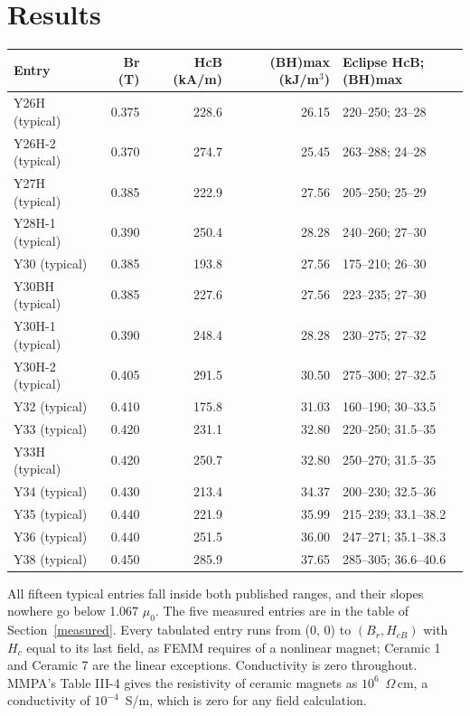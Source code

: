 \documentclass[
  11pt,
]{article}
\begin{document}
\section{Results}\label{results}

\begin{center}
\begin{tabular}{lrrrl}
\toprule
Entry & Br (T) & HcB (kA/m) & (BH)max (kJ/m\(^3\)) & Eclipse HcB; (BH)max \\
\midrule
Y26H (typical) & 0.375 & 228.6 & 26.15 & 220--250; 23--28 \\
Y26H-2 (typical) & 0.370 & 274.7 & 25.45 & 263--288; 24--28 \\
Y27H (typical) & 0.385 & 222.9 & 27.56 & 205--250; 25--29 \\
Y28H-1 (typical) & 0.390 & 250.4 & 28.28 & 240--260; 27--30 \\
Y30 (typical) & 0.385 & 193.8 & 27.56 & 175--210; 26--30 \\
Y30BH (typical) & 0.385 & 227.6 & 27.56 & 223--235; 27--30 \\
Y30H-1 (typical) & 0.390 & 248.4 & 28.28 & 230--275; 27--32 \\
Y30H-2 (typical) & 0.405 & 291.5 & 30.50 & 275--300; 27--32.5 \\
Y32 (typical) & 0.410 & 175.8 & 31.03 & 160--190; 30--33.5 \\
Y33 (typical) & 0.420 & 231.1 & 32.80 & 220--250; 31.5--35 \\
Y33H (typical) & 0.420 & 250.7 & 32.80 & 250--270; 31.5--35 \\
Y34 (typical) & 0.430 & 213.4 & 34.37 & 200--230; 32.5--36 \\
Y35 (typical) & 0.440 & 221.9 & 35.99 & 215--239; 33.1--38.2 \\
Y36 (typical) & 0.440 & 251.5 & 36.00 & 247--271; 35.1--38.3 \\
Y38 (typical) & 0.450 & 285.9 & 37.65 & 285--305; 36.6--40.6 \\
\bottomrule
\end{tabular}
\end{center}

All fifteen typical entries fall inside both published ranges, and their slopes nowhere go below 1.067 \(\mu_0\). The five measured entries are in the table of Section~\ref{measured}. Every tabulated entry runs from (0, 0) to \((B_r, H_{cB})\) with \(H_c\) equal to its last field, as FEMM requires of a nonlinear magnet; Ceramic 1 and Ceramic 7 are the linear exceptions. Conductivity is zero throughout. MMPA's Table III-4 \cite{mmpa} gives the resistivity of ceramic magnets as \(10^6\)~\(\Omega\)\,cm, a conductivity of \(10^{-4}\)~S/m, which is zero for any field calculation.
\end{document}

